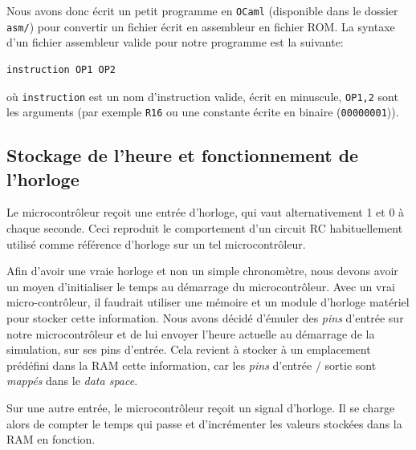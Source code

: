 \documentclass[11pt]{article}
\begin{document}
Nous avons donc écrit un petit programme en \texttt{OCaml} (disponible dans le dossier \texttt{asm/}) pour convertir un fichier écrit en assembleur en fichier ROM. La syntaxe d'un fichier assembleur valide pour notre programme est la suivante:
\begin{verbatim}
instruction OP1 OP2
\end{verbatim}
où \texttt{instruction} est un nom d'instruction valide, écrit en minuscule, \texttt{OP1,2} sont les arguments (par exemple \texttt{R16} ou une constante écrite en binaire (\texttt{00000001})).


\subsection{Stockage de l'heure et fonctionnement de l'horloge}

Le microcontrôleur reçoit une entrée d'horloge, qui vaut alternativement 1 et 0 à chaque seconde. Ceci reproduit le comportement d'un circuit RC habituellement utilisé comme référence d'horloge sur un tel microcontrôleur.

Afin d'avoir une vraie horloge et non un simple chronomètre, nous devons avoir un moyen d'initialiser le temps au démarrage du microcontrôleur. Avec un vrai micro-contrôleur, il faudrait utiliser une mémoire et un module d'horloge matériel pour stocker cette information. Nous avons décidé d'émuler des \emph{pins} d'entrée sur notre microcontrôleur et de lui envoyer l'heure actuelle au démarrage de la simulation, sur ses pins d'entrée. Cela revient à stocker à un emplacement prédéfini dans la RAM cette information, car les \emph{pins} d'entrée / sortie sont \emph{mappés} dans le \emph{data space}.

Sur une autre entrée, le microcontrôleur reçoit un signal d'horloge. Il se charge alors de compter le temps qui passe et d'incrémenter les valeurs stockées dans la RAM en fonction.
\end{document}
